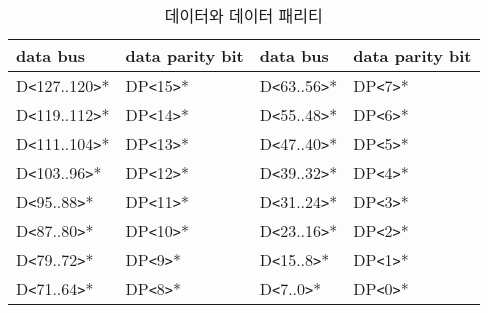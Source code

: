 %
%
\begin{table}[htbp]
\caption{데이터와 데이터 패리티}
   \begin{center}
   \begin{tabular}{|l|l||l|l|} \hline
      data bus & data parity bit & data bus & data parity bit \\ \hline \hline
      D{\tt <}127..120{\tt >}* & DP{\tt <}15{\tt >}* &
      D{\tt <}63..56{\tt >}* & DP{\tt <}7{\tt >}* \\ \hline
      D{\tt <}119..112{\tt >}* & DP{\tt <}14{\tt >}* &
      D{\tt <}55..48{\tt >}* & DP{\tt <}6{\tt >}* \\ \hline
      D{\tt <}111..104{\tt >}* & DP{\tt <}13{\tt >}* &
      D{\tt <}47..40{\tt >}* & DP{\tt <}5{\tt >}* \\ \hline
      D{\tt <}103..96{\tt >}* & DP{\tt <}12{\tt >}* &
      D{\tt <}39..32{\tt >}* & DP{\tt <}4{\tt >}* \\ \hline
      D{\tt <}95..88{\tt >}* & DP{\tt <}11{\tt >}* &
      D{\tt <}31..24{\tt >}* & DP{\tt <}3{\tt >}* \\ \hline
      D{\tt <}87..80{\tt >}* & DP{\tt <}10{\tt >}* &
      D{\tt <}23..16{\tt >}* & DP{\tt <}2{\tt >}* \\ \hline
      D{\tt <}79..72{\tt >}* & DP{\tt <}9{\tt >}* &
      D{\tt <}15..8{\tt >}* & DP{\tt <}1{\tt >}* \\ \hline
      D{\tt <}71..64{\tt >}* & DP{\tt <}8{\tt >}* &
      D{\tt <}7..0{\tt >}* & DP{\tt <}0{\tt >}* \\ \hline
   \end{tabular}
   \end{center}
\end{table}
%
%

